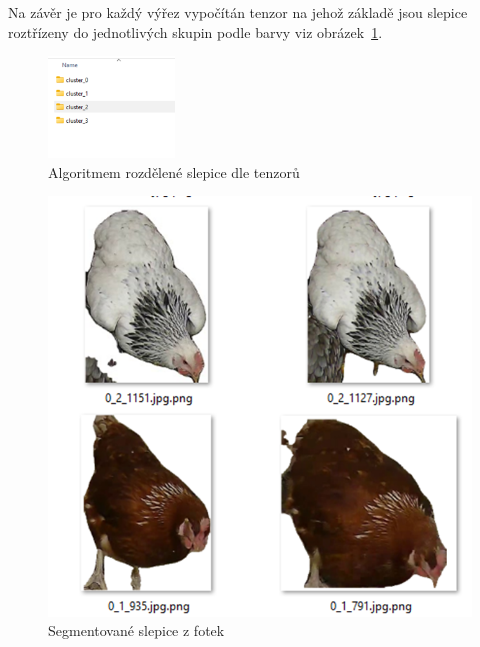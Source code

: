 Na závěr je pro každý výřez vypočítán tenzor na jehož základě jsou slepice roztřízeny do jednotlivých skupin podle barvy viz obrázek~\ref{fig:chicks_in_clusters}.

\begin{figure}[H]
    \centering
    \includegraphics[width=0.3\textwidth]{img/chicks_in_clusters}
    \caption{Algoritmem rozdělené slepice dle tenzorů}
    \label{fig:chicks_in_clusters}
\end{figure}
\begin{figure}[h]
    \centering
    \includegraphics[width=\textwidth]{img/segmented_chicks}
    \caption{Segmentované slepice z fotek}
    \label{fig:segmented_chicks}
\end{figure}
